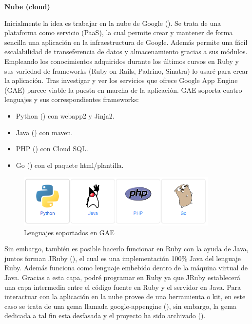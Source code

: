 \vspace*{0.3in}
\begin{LARGE}
	\textbf{{\huge Nube (cloud)}}
\end{LARGE}

\vspace*{0.1in}
Inicialmente la idea es trabajar en la nube de Google (\cite{URL:GAEdoc}). Se trata de una plataforma como servicio (PaaS), la cual permite crear y mantener de forma sencilla una aplicación en la infraestructura de Google. Además permite una fácil escalabilidad de transeferencia de datos y almacenamiento gracias a sus módulos.\\

Empleando los conocimientos adquiridos durante los últimos cursos en Ruby y sus variedad de frameworks (Ruby on Rails, Padrino, Sinatra) lo usaré para crear la aplicación. Tras investigar y ver los servicios que ofrece Google App Engine (GAE) parece viable la puesta en marcha de la aplicación. GAE soporta cuatro lenguajes y sus correspondientes frameworks:
\begin{itemize}
	\item Python (\cite{URL:GAE_Python}) con webapp2 y Jinja2.
	\item Java (\cite{URL:GAE_Java}) con maven.
	\item PHP (\cite{URL:GAE_PHP}) con Cloud SQL.
	\item Go (\cite{URL:GAE_Go}) con el paquete html/plantilla. 
\end{itemize}

\begin{figure}[H]
	\centering
		\includegraphics[width=10cm]{./images/lenguajes-GAE.png}
		\caption{Lenguajes soportados en GAE} \label{fig:lenguajes-GAE}
\end{figure}

Sin embargo, también es posible hacerlo funcionar en Ruby con la ayuda de Java, juntos forman JRuby (\cite{URL:JRuby}), el cual es una implementación 100\% Java del lenguaje Ruby. Además funciona como lenguaje embebido dentro de la máquina virtual de Java. Gracias a esta capa, podré programar en Ruby ya que JRuby establecerá una capa intermedia entre el código fuente en Ruby y el servidor en Java. Para interactuar con la aplicación en la nube provee de una herramienta o kit, en este caso se trata de una gema llamada google-appengine (\cite{URL:GAE_gem}), sin embargo, la gema
dedicada a tal fin esta desfasada y el proyecto ha sido archivado (\cite{URL:GAE_JRuby}).\\

